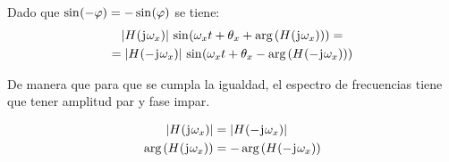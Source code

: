 Dado que $\fx[\sin]{-\varphi} = - \fx[\sin]{\varphi}$ se tiene:
\begin{multline*}
    \norm{\fx[H]{\iu \omega_x}}
    \, \fx[\sin]{\omega_x t + \theta_x + \fx[\arg]{\fx[H]{\iu \omega_x}}}
    =
    \\
    =
    \norm{\fx[H]{- \iu \omega_x}}
    \, \fx[\sin]{\omega_x t + \theta_x - \fx[\arg]{\fx[H]{- \iu \omega_x}}}
\end{multline*}

De manera que para que se cumpla la igualdad, el espectro de frecuencias tiene que tener amplitud par y fase impar.

\begin{mdframed}[style=PropertyFrame]
    \begin{prop}
    \end{prop}
    \begin{align*}
        \norm{\fx[H]{\iu \omega_x}} & = \norm{\fx[H]{- \iu \omega_x}}
        \\
        \fx[\arg]{\fx[H]{\iu \omega_x}} & = - \fx[\arg]{\fx[H]{- \iu \omega_x}}
    \end{align*}
\end{mdframed}

